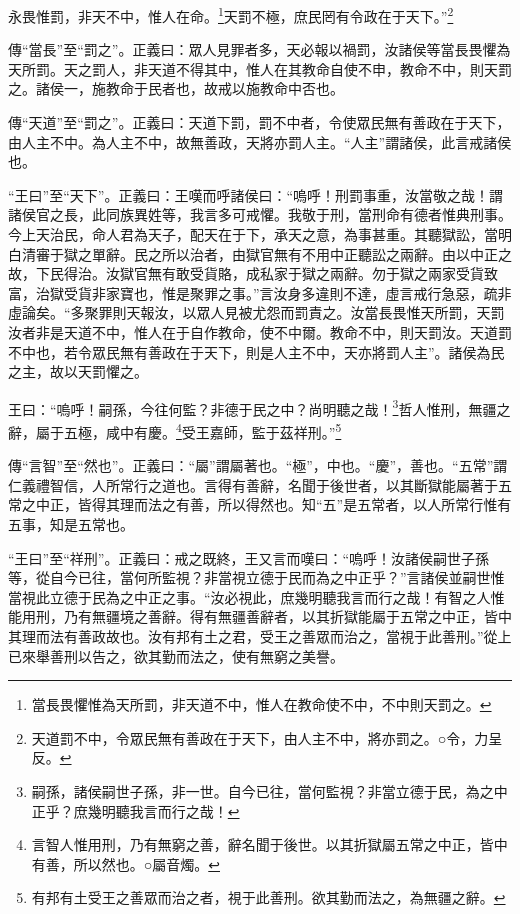 永畏惟罰，非天不中，惟人在命。\footnote{當長畏懼惟為天所罰，非天道不中，惟人在教命使不中，不中則天罰之。}天罰不極，庶民罔有令政在于天下。”\footnote{天道罰不中，令眾民無有善政在于天下，由人主不中，將亦罰之。○令，力呈反。}

{\noindent\zhuan{}\fzbyks 傳“當長”至“罰之”。正義曰：眾人見罪者多，天必報以禍罰，汝諸侯等當長畏懼為天所罰。天之罰人，非天道不得其中，惟人在其教命自使不申，教命不中，則天罰之。諸侯一，施教命于民者也，故戒以施教命中否也。 \par}

{\noindent\zhuan{}\fzbyks 傳“天道”至“罰之”。正義曰：天道下罰，罰不中者，令使眾民無有善政在于天下，由人主不中。為人主不中，故無善政，天將亦罰人主。“人主”謂諸侯，此言戒諸侯也。 \par}

{\noindent\shu{}\fzkt “王曰”至“天下”。正義曰：王嘆而呼諸侯曰：“嗚呼！刑罰事重，汝當敬之哉！謂諸侯官之長，此同族異姓等，我言多可戒懼。我敬于刑，當刑命有德者惟典刑事。今上天治民，命人君為天子，配天在于下，承天之意，為事甚重。其聽獄訟，當明白清審于獄之單辭。民之所以治者，由獄官無有不用中正聽訟之兩辭。由以中正之故，下民得治。汝獄官無有敢受貨賂，成私家于獄之兩辭。勿于獄之兩家受貨致富，治獄受貨非家寶也，惟是聚罪之事。”言汝身多違則不達，虛言戒行急惡，疏非虛論矣。“多聚罪則天報汝，以眾人見被尤怨而罰責之。汝當長畏惟天所罰，天罰汝者非是天道不中，惟人在于自作教命，使不中爾。教命不中，則天罰汝。天道罰不中也，若令眾民無有善政在于天下，則是人主不中，天亦將罰人主”。諸侯為民之主，故以天罰懼之。 \par}

王曰：“嗚呼！嗣孫，今往何監？非德于民之中？尚明聽之哉！\footnote{嗣孫，諸侯嗣世子孫，非一世。自今已往，當何監視？非當立德于民，為之中正乎？庶幾明聽我言而行之哉！}哲人惟刑，無疆之辭，屬于五極，咸中有慶。\footnote{言智人惟用刑，乃有無窮之善，辭名聞于後世。以其折獄屬五常之中正，皆中有善，所以然也。○屬音燭。}受王嘉師，監于茲祥刑。”\footnote{有邦有土受王之善眾而治之者，視于此善刑。欲其勤而法之，為無疆之辭。}


{\noindent\zhuan{}\fzbyks 傳“言智”至“然也”。正義曰：“屬”謂屬著也。“極”，中也。“慶”，善也。“五常”謂仁義禮智信，人所常行之道也。言得有善辭，名聞于後世者，以其斷獄能屬著于五常之中正，皆得其理而法之有善，所以得然也。知“五”是五常者，以人所常行惟有五事，知是五常也。 \par}

{\noindent\shu{}\fzkt “王曰”至“祥刑”。正義曰：戒之既終，王又言而嘆曰：“嗚呼！汝諸侯嗣世子孫等，從自今已往，當何所監視？非當視立德于民而為之中正乎？”言諸侯並嗣世惟當視此立德于民為之中正之事。“汝必視此，庶幾明聽我言而行之哉！有智之人惟能用刑，乃有無疆境之善辭。得有無疆善辭者，以其折獄能屬于五常之中正，皆中其理而法有善政故也。汝有邦有土之君，受王之善眾而治之，當視于此善刑。”從上已來舉善刑以告之，欲其勤而法之，使有無窮之美譽。 \par}

